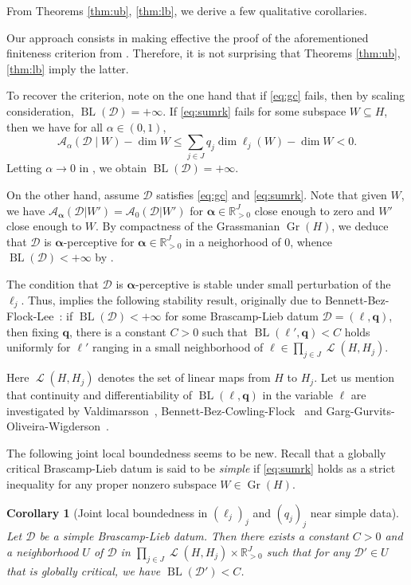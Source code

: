 \documentclass[a4paper,english]{amsart}
\newtheorem{corollary}[thm]{Corollary}
\theoremstyle{definition}
\newcommand{\R}{\mathbb{R}}
\newcommand{\bba}{\boldsymbol{\alpha}}
\newcommand{\1}{\mathbbm{1}}
\newcommand{\sD} {{\mathscr D}}
\newcommand{\sA}{\mathscr{A}}
\DeclareMathOperator{\Ell}{\mathscr{L}}
\DeclareMathOperator{\Gr}{Gr}
\DeclareMathOperator{\BL}{BL}
\begin{document}
\bigskip
{}
From Theorems \ref{thm:ub}, \ref{thm:lb}, we  derive a few qualitative corollaries.

\bigskip
{}
Our approach consists in making effective the proof of the aforementioned finiteness criterion from \cite{BCCT08}. Therefore, it is not surprising that Theorems \ref{thm:ub}, \ref{thm:lb} imply the latter.

To recover the criterion, note  on the one hand that if \eqref{eq:gc} fails, then by scaling consideration, $\BL(\sD) = +\infty$.
If \eqref{eq:sumrk} fails for some subspace $W \subseteq H$, then we have for all $\alpha \in (0,1)$,
\[
\sA_{\alpha}(\sD\mid W)  - \dim W \leq \sum_{j \in J} q_j  \dim\ell_{j}(W) - \dim W < 0.
\]
Letting $\alpha \to 0$ in , we obtain $\BL(\sD) = +\infty$.

On the other hand, assume $\sD$ satisfies \eqref{eq:gc}  and  \eqref{eq:sumrk}. Note that given $W$, we have $\sA_{\bba}(\sD|W')= \sA_{0}(\sD|W')$ for $\bba\in \R_{>0}^J$ close enough to zero and $W'$ close enough to $W$. By compactness of the Grassmanian $\Gr(H)$, we deduce that $\sD$ is $\bba$-perceptive for $\bba\in \R_{>0}^J$ in a neighorhood of $0$, whence $\BL(\sD) < + \infty$ by .



\bigskip
{} %
The condition that $\sD$ is  $\bba$-perceptive is stable under small perturbation of the $\ell_{j}$.
Thus,  implies the following stability result, originally due to Bennett-Bez-Flock-Lee~\cite{BBFL18}: if $\BL(\sD) < +\infty$ for some Brascamp-Lieb datum $\sD = (\boldsymbol{\ell}, \mathbf{q})$, then fixing $\mathbf{q}$, there is a constant $C > 0$ such that $\BL(\boldsymbol{\ell}', \mathbf{q}) < C$ holds uniformly for $\boldsymbol{\ell}'$ ranging in a small neighborhood of $\boldsymbol{\ell} \in \prod_{j \in J} \Ell(H, H_j)$.

Here $\Ell(H, H_j)$ denotes the set of linear maps from $H$ to $H_{j}$.
Let us mention that continuity and differentiability of $\BL(\boldsymbol{\ell}, \mathbf{q})$ in the variable $\boldsymbol{\ell}$ are investigated by Valdimarsson~\cite{Valdimarsson}, Bennett-Bez-Cowling-Flock~\cite{BBCF} and Garg-Gurvits-Oliveira-Wigderson~\cite{GGOW}.


\bigskip
{}
The following joint local boundedness seems to be new.
Recall that a globally critical Brascamp-Lieb datum is said to be \emph{simple} if \eqref{eq:sumrk} holds as a strict inequality for any proper nonzero subspace $W \in \Gr(H)$.
\begin{corollary}[Joint local boundedness in $(\ell_j)_j$ and $(q_j)_j$ near simple data]
Let $\sD$ be a simple Brascamp-Lieb datum.
Then there exists a constant $C > 0$ and a neighborhood $U$ of $\sD$ in $\prod_{j \in J} \Ell(H,H_j) \times \R_{>0}^J$ such that for any $\sD' \in U$ that is globally critical, we have $\BL(\sD') < C$.
\end{corollary}
\end{document}
